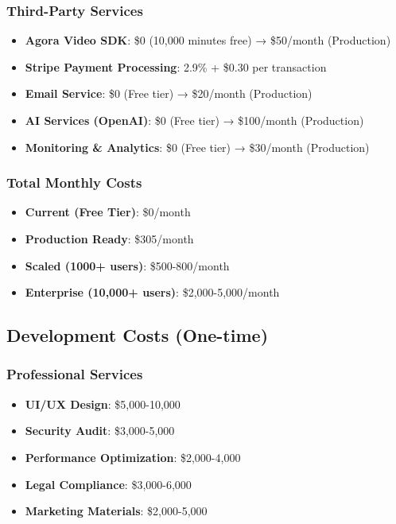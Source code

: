 \documentclass[11pt,a4paper]{article}
\begin{document}
\subsubsection{Third-Party Services}
\begin{itemize}
    \item \textbf{Agora Video SDK}: \$0 (10,000 minutes free) → \$50/month (Production)
    \item \textbf{Stripe Payment Processing}: 2.9\% + \$0.30 per transaction
    \item \textbf{Email Service}: \$0 (Free tier) → \$20/month (Production)
    \item \textbf{AI Services (OpenAI)}: \$0 (Free tier) → \$100/month (Production)
    \item \textbf{Monitoring \& Analytics}: \$0 (Free tier) → \$30/month (Production)
\end{itemize}

\subsubsection{Total Monthly Costs}
\begin{itemize}
    \item \textbf{Current (Free Tier)}: \$0/month
    \item \textbf{Production Ready}: \$305/month
    \item \textbf{Scaled (1000+ users)}: \$500-800/month
    \item \textbf{Enterprise (10,000+ users)}: \$2,000-5,000/month
\end{itemize}

\subsection{Development Costs (One-time)}

\subsubsection{Professional Services}
\begin{itemize}
    \item \textbf{UI/UX Design}: \$5,000-10,000
    \item \textbf{Security Audit}: \$3,000-5,000
    \item \textbf{Performance Optimization}: \$2,000-4,000
    \item \textbf{Legal Compliance}: \$3,000-6,000
    \item \textbf{Marketing Materials}: \$2,000-5,000
\end{itemize}
\end{document}
